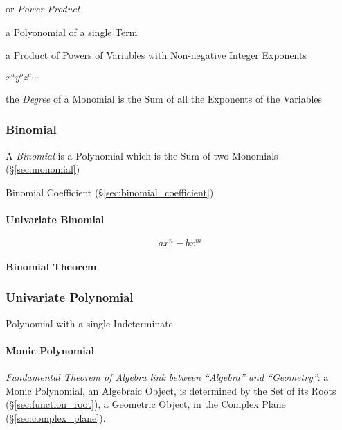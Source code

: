 or \emph{Power Product}

a Polyonomial of a single Term

a Product of Powers of Variables with Non-negative Integer Exponents

$x^a y^b z^c \cdots$

the \emph{Degree} of a Monomial is the Sum of all the Exponents of the
Variables



\subsubsection{Binomial}\label{sec:binomial}

A \emph{Binomial} is a Polynomial which is the Sum of two Monomials
(\S\ref{sec:monomial})

Binomial Coefficient (\S\ref{sec:binomial_coefficient})



\paragraph{Univariate Binomial}\label{sec:univariate_binomial}\hfill

\[
  a x^n - b x^m
\]


\paragraph{Binomial Theorem}\label{sec:binomial_theorem}\hfill



\subsubsection{Univariate Polynomial}\label{sec:univariate_polynomial}

Polynomial with a single Indeterminate



\paragraph{Monic Polynomial}\label{sec:monic_polynomial}\hfill

\emph{Fundamental Theorem of Algebra link between ``Algebra'' and
  ``Geometry''}: a Monic Polynomial, an Algebraic Object, is determined by the
Set of its Roots (\S\ref{sec:function_root}), a Geometric Object, in the
Complex Plane (\S\ref{sec:complex_plane}).



